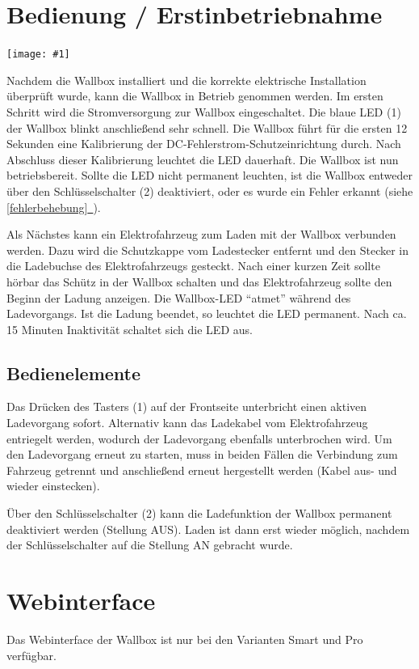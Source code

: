 \documentclass[a4paper,10pt]{article}
\newcommand{\gfx}[1]{\texttt{[image: \#1]}}
\newcommand*{\fullref}[1]{\hyperref[{#1}]{\ref*{#1}~\nameref*{#1}}}
\begin{document}
\begin{multicols*}{2}
	\section{Bedienung / Erstinbetriebnahme}

	\gfx{./img/resized/warp_button_key_ready}

	Nachdem die Wallbox installiert
	und die korrekte elektrische Installation überprüft wurde, kann die Wallbox in
	Betrieb genommen werden.
	Im ersten Schritt wird die Stromversorgung zur Wallbox eingeschaltet. Die
	blaue LED (1) der Wallbox blinkt anschließend sehr schnell. Die Wallbox führt
	für die ersten 12 Sekunden eine Kalibrierung der
	DC-Fehlerstrom-Schutzeinrichtung durch. Nach Abschluss dieser Kalibrierung
	leuchtet die LED dauerhaft. Die Wallbox ist nun betriebsbereit. Sollte die LED
	nicht permanent leuchten, ist die Wallbox entweder über den Schlüsselschalter (2) deaktiviert,
	oder es wurde ein Fehler erkannt (siehe \fullref{fehlerbehebung}).

	Als Nächstes kann ein Elektrofahrzeug zum Laden mit der Wallbox verbunden
	werden. Dazu wird die Schutzkappe vom Ladestecker entfernt und den Stecker in die
	Ladebuchse des Elektrofahrzeugs gesteckt. Nach einer kurzen Zeit sollte hörbar
	das Schütz in der Wallbox schalten und das Elektrofahrzeug sollte den Beginn
	der Ladung anzeigen. Die Wallbox-LED \enquote{atmet} während des
	Ladevorgangs. Ist die Ladung beendet, so leuchtet die LED permanent. Nach ca.
	15 Minuten Inaktivität schaltet sich die LED aus.

	\subsection{Bedienelemente}\label{lockswitch}
	Das Drücken des Tasters (1) auf der Frontseite unterbricht einen aktiven Ladevorgang
	sofort. Alternativ kann das Ladekabel vom Elektrofahrzeug entriegelt werden,
	wodurch der Ladevorgang ebenfalls unterbrochen wird. Um den Ladevorgang erneut
	zu starten, muss in beiden Fällen die Verbindung zum Fahrzeug getrennt und
	anschließend erneut hergestellt werden (Kabel aus- und wieder einstecken).

	Über den Schlüsselschalter (2) kann die Ladefunktion der Wallbox permanent deaktiviert
	werden (Stellung AUS). Laden ist dann erst wieder möglich, nachdem der Schlüsselschalter
	auf die Stellung AN gebracht wurde.

	\section{Webinterface}
	Das Webinterface der Wallbox ist nur bei den Varianten Smart und Pro verfügbar.


\end{multicols*}
\end{document}
